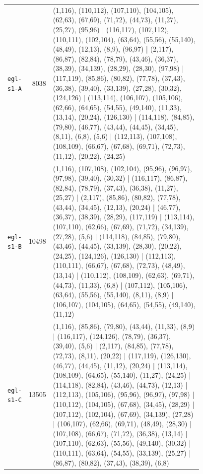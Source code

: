 \begin{landscape}
\begin{longtable}{lr>{\tiny\raggedright\arraybackslash}p{0.78\linewidth}}
\texttt{egl-s1-A} & 8038 & (1,116), (110,112), (107,110), (104,105), (62,63), (67,69), (71,72), (44,73), (11,27), (25,27), (95,96) | (116,117), (107,112), (110,111), (102,104), (63,64), (55,56), (55,140), (48,49), (12,13), (8,9), (96,97) | (2,117), (86,87), (82,84), (78,79), (43,46), (36,37), (38,39), (34,139), (28,29), (28,30), (97,98) | (117,119), (85,86), (80,82), (77,78), (37,43), (36,38), (39,40), (33,139), (27,28), (30,32), (124,126) | (113,114), (106,107), (105,106), (62,66), (64,65), (54,55), (49,140), (11,33), (13,14), (20,24), (126,130) | (114,118), (84,85), (79,80), (46,77), (43,44), (44,45), (34,45), (8,11), (6,8), (5,6) | (112,113), (107,108), (108,109), (66,67), (67,68), (69,71), (72,73), (11,12), (20,22), (24,25) \\[2pt]
\texttt{egl-s1-B} & 10498 & (1,116), (107,108), (102,104), (95,96), (96,97), (97,98), (39,40), (30,32) | (116,117), (86,87), (82,84), (78,79), (37,43), (36,38), (11,27), (25,27) | (2,117), (85,86), (80,82), (77,78), (43,44), (34,45), (12,13), (20,24) | (46,77), (36,37), (38,39), (28,29), (117,119) | (113,114), (107,110), (62,66), (67,69), (71,72), (34,139), (27,28), (5,6) | (114,118), (84,85), (79,80), (43,46), (44,45), (33,139), (28,30), (20,22), (24,25), (124,126), (126,130) | (112,113), (110,111), (66,67), (67,68), (72,73), (48,49), (13,14) | (110,112), (108,109), (62,63), (69,71), (44,73), (11,33), (6,8) | (107,112), (105,106), (63,64), (55,56), (55,140), (8,11), (8,9) | (106,107), (104,105), (64,65), (54,55), (49,140), (11,12) \\[2pt]
\texttt{egl-s1-C} & 13505 & (1,116), (85,86), (79,80), (43,44), (11,33), (8,9) | (116,117), (124,126), (78,79), (36,37), (39,40), (5,6) | (2,117), (84,85), (77,78), (72,73), (8,11), (20,22) | (117,119), (126,130), (46,77), (44,45), (11,12), (20,24) | (113,114), (108,109), (64,65), (55,140), (11,27), (24,25) | (114,118), (82,84), (43,46), (44,73), (12,13) | (112,113), (105,106), (95,96), (96,97), (97,98) | (110,112), (104,105), (67,68), (34,45), (28,29) | (107,112), (102,104), (67,69), (34,139), (27,28) | (106,107), (62,66), (69,71), (48,49), (28,30) | (107,108), (66,67), (71,72), (36,38), (13,14) | (107,110), (62,63), (55,56), (49,140), (30,32) | (110,111), (63,64), (54,55), (33,139), (25,27) | (86,87), (80,82), (37,43), (38,39), (6,8) \\[2pt]

\end{longtable}
\end{landscape}
